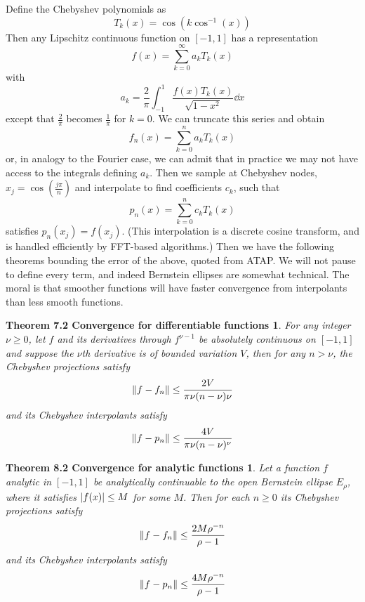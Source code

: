 Define the Chebyshev polynomials as 
\[  T_k(x) = \cos(k \cos^{-1}(x))\]
Then any Lipschitz continuous function on $[-1,1]$ has a representation 
\[ f(x) = \sum_{k=0}^{\infty} a_k T_k(x) \]
with
\[ a_k = \frac{2}{\pi} \int_{-1}^{1} \frac{f(x) T_k(x)}{\sqrt{1-x^2}} \dd{x} \]
except that $\frac{2}{\pi}$ becomes $\frac{1}{\pi}$ for $k=0$.  
We can truncate this series and obtain 
\[ f_n(x) = \sum_{k=0}^{n} a_k T_k(x) \]
or, in analogy to the Fourier case, we can admit that in practice we may not have access to the integrals defining $a_k$.  Then we sample at Chebyshev nodes, $x_j = \cos \left(  \frac{j \pi}{n} \right)$ and interpolate to find coefficients $c_k$, such that\[p_n(x) =   \sum_{k=0}^{n} c_k T_k(x) \]
satisfies $p_n(x_j) = f(x_j)$.  (This interpolation is a discrete cosine transform, and is handled efficiently by FFT-based algorithms.)  Then we have the following theorems bounding the error of the above, quoted from ATAP.  We will not pause to define every term, and indeed Bernstein ellipses are somewhat technical.  The moral is that smoother functions will have faster convergence from interpolants than less smooth functions.
\newtheorem*{ATAP7-2}{Theorem 7.2 Convergence for differentiable functions}
\begin{ATAP7-2}
	For any integer $\nu \ge 0$, let $f$ and its derivatives through $f^{\nu -1}$ be absolutely continuous on $[-1,1]$ and suppose the $\nu$th derivative is of bounded variation $V$, then for any $n > \nu$, the Chebyshev projections satisfy 
	\[  \norm{f - f_n} \leq \frac{2V}{\pi \nu (n - \nu)\nu} \]
	and its Chebyshev interpolants satisfy
	\[ \norm {f- p_n} \leq \frac{4V}{\pi \nu (n-\nu)^{\nu}}\]
\end{ATAP7-2}
\newtheorem*{ATAP8-2}{Theorem 8.2 Convergence for analytic functions}
\begin{ATAP8-2}
	Let a function $f$ analytic in $[-1,1]$ be analytically continuable to the open Bernstein ellipse $E_\rho$, where it satisfies $\abs{f(x)}\leq M$ for some $M$.  Then for each $n \geq 0$ its Chebyshev projections satisfy 
	\[  \norm{f - f_n} \leq \frac{2 M \rho^{-n} }{\rho - 1} \]
	and its Chebyshev interpolants satisfy
	\[ \norm {f- p_n} \leq \frac{4 M \rho^{-n} }{\rho - 1}\]
\end{ATAP8-2}




